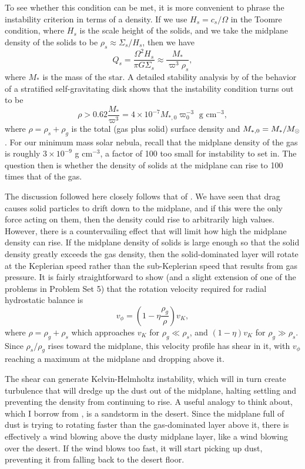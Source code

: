 To see whether this condition can be met, it is more convenient to phrase the instability criterion in terms of a density. If we use $H_s=c_s/\Omega$ in the Toomre condition, where $H_s$ is the scale height of the solids, and we take the midplane density of the solids to be $\rho_s \approx \Sigma_s/H_s$, then we have
\begin{equation}
Q_s  = \frac{\Omega^2 H_s}{\pi G \Sigma_s} \approx \frac{M_*}{\varpi^3 \rho_s},
\end{equation}
where $M_*$ is the mass of the star. A detailed stability analysis by \citet{sekiya1983} of the behavior of a stratified self-gravitating disk shows that the instability condition turns out to be
\begin{equation}
\rho > 0.62\frac{M_*}{\varpi^3} = 4\times 10^{-7} M_{*,0} \varpi_0^{-3} \mbox{ g cm}^{-3},
\end{equation}
where $\rho = \rho_s + \rho_g$ is the total (gas plus solid) surface density and $M_{*,0}=M_*/M_{\odot}$. For our minimum mass solar nebula, recall that the midplane density of the gas is roughly $3\times 10^{-9}$ g cm$^{-3}$, a factor of 100 too small for instability to set in. The question then is whether the density of solids at the midplane can rise to 100 times that of the gas.

The discussion followed here closely follows that of \citet{youdin02a}. We have seen that drag causes solid particles to drift down to the midplane, and if this were the only force acting on them, then the density could rise to arbitrarily high values. However, there is a countervailing effect that will limit how high the midplane density can rise. If the midplane density of solids is large enough so that the solid density greatly exceeds the gas density, then the solid-dominated layer will rotate at the Keplerian speed rather than the sub-Keplerian speed that results from gas pressure. It is fairly straightforward to show (and a slight extension of one of the problems in Problem Set 5) that the rotation velocity required for radial hydrostatic balance is
\begin{equation}
v_{\phi} = \left(1-\eta \frac{\rho_g}{\rho}\right) v_K,
\end{equation}
where $\rho = \rho_g + \rho_s$ which approaches $v_K$ for $\rho_g \ll \rho_s$, and $(1-\eta) v_K$ for $\rho_g \gg \rho_s$. Since $\rho_s / \rho_g$ rises toward the midplane, this velocity profile has shear in it, with $v_{\phi}$ reaching a maximum at the midplane and dropping above it.

The shear can generate Kelvin-Helmholtz instability, which will in turn create turbulence that will dredge up the dust out of the midplane, halting settling and preventing the density from continuing to rise. A useful analogy to think about, which I borrow from \citet{youdin02a}, is a sandstorm in the desert. Since the midplane full of dust is trying to rotating faster than the gas-dominated layer above it, there is effectively a wind blowing above the dusty midplane layer, like a wind blowing over the desert. If the wind blows too fast, it will start picking up dust, preventing it from falling back to the desert floor.

